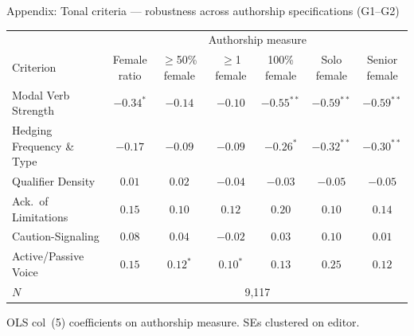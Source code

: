 \documentclass[aspectratio=169,11pt]{beamer}
\begin{document}
\begin{frame}{Appendix: Tonal criteria — robustness across authorship specifications (G1--G2)}
    \vfill
    \begin{center}
    {\small
    \begin{tabular}{lcccccc}
        \toprule
        & \multicolumn{6}{c}{Authorship measure} \\
        \cmidrule(lr){2-7}
        Criterion
            & \shortstack[c]{Female\\ratio}
            & \shortstack[c]{$\geq$50\%\\female}
            & \shortstack[c]{$\geq$1\\female}
            & \shortstack[c]{100\%\\female}
            & \shortstack[c]{Solo\\female}
            & \shortstack[c]{Senior\\female} \\
        \midrule
        Modal Verb Strength       & $-0.34^{*}$  & $-0.14$      & $-0.10$      & $-0.55^{**}$ & $-0.59^{**}$ & $-0.59^{**}$ \\
        Hedging Frequency \& Type & $-0.17$      & $-0.09$      & $-0.09$      & $-0.26^{*}$  & $-0.32^{**}$ & $-0.30^{**}$ \\
        Qualifier Density         & $0.01$       & $0.02$       & $-0.04$      & $-0.03$      & $-0.05$      & $-0.05$      \\
        Ack.\ of Limitations      & $0.15$       & $0.10$       & $0.12$       & $0.20$       & $0.10$       & $0.14$       \\
        Caution-Signaling         & $0.08$       & $0.04$       & $-0.02$      & $0.03$       & $0.10$       & $0.01$       \\
        Active/Passive Voice      & $0.15$       & $0.12^{*}$   & $0.10^{*}$   & $0.13$       & $0.25$       & $0.12$       \\
        \midrule
        $N$                       & \multicolumn{6}{c}{9,117} \\
        \bottomrule
    \end{tabular}
    }
    \end{center}
    \vspace{0.2cm}
    \begin{center}
        {\small\color{WarmGray}
        OLS col~(5) coefficients on authorship measure. SEs clustered on editor.}
    \end{center}
    \vfill
\end{frame}
\end{document}
